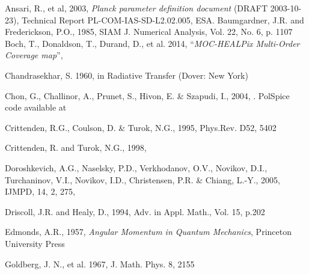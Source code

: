 \documentclass[12pt,twoside]{article}
\begin{document}


\begin{thebibliography}{99}
%

Ansari, R., et al, 2003, {\em Planck parameter definition document} (DRAFT
2003-10-23), Technical Report PL-COM-IAS-SD-L2.02.005, ESA.
%
Baumgardner, J.R. and Frederickson, P.O., 1985, SIAM J. Numerical Analysis, Vol. 22,
No. 6, p. 1107
%
Boch, T., Donaldson, T., Durand, D., et al. 2014, 
``{\em MOC-HEALPix Multi-Order Coverage map}'', 

Chandrasekhar, S. 1960, in Radiative Transfer (Dover: New York) 

Chon, G., Challinor, A., Prunet, S., Hivon, E. \& Szapudi, I., 2004, 
.
PolSpice code available at 



Crittenden, R.G., Coulson, D. \&  Turok, N.G., 1995, Phys.Rev. D52, 5402

Crittenden, R. and Turok, N.G., 1998, 

Doroshkevich, A.G.,
Naselsky,    P.D.,  
Verkhodanov, O.V.,  
Novikov,     D.I.,  
Turchaninov, V.I.,  
Novikov,     I.D.,  
Christensen, P.R. \&
Chiang,	     L.-Y., 2005,
IJMPD, 14, 2, 275, 

Driscoll, J.R. and Healy, D., 1994, Adv. in Appl. Math., Vol. 15, p.202

Edmonds, A.R., 1957, {\em Angular Momentum in Quantum Mechanics}, Princeton
University Press

Goldberg, J. N., et al. 1967, J. Math. Phys. 8, 2155


\end{thebibliography}
\end{document}
